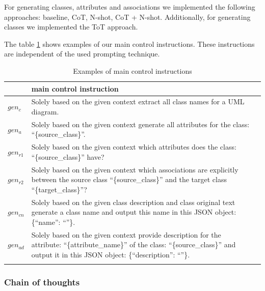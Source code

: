 For generating classes, attributes and associations we implemented the following approaches: baseline, CoT, N-shot, CoT + N-shot. Additionally, for generating classes we implemented the ToT approach.

The table \ref{tab:main-control-instructions} shows examples of our main control instructions. These instructions are independent of the used prompting technique.

\begin{table}[!h]
    \scriptsize
    \centering
    \setlength{\tabcolsep}{0.5em}
\begin{tabular}{@{}l>{\raggedright\arraybackslash}p{}>{\raggedright\arraybackslash}p{}@{}}
         & main control instruction \\
    \toprule
    \addlinespace
    
$gen_c$ & Solely based on the given context extract all class names for a UML diagram. \\
\addlinespace

$gen_a$ & Solely based on the given context generate all attributes for the class: ``\{source\_class\}''. \\
\addlinespace

$gen_{r1}$ & Solely based on the given context which attributes does the class: ``\{source\_class\}'' have? \\
\addlinespace

$gen_{r2}$ & Solely based on the given context which associations are explicitly between the source class ``\{source\_class\}'' and the target class ``\{target\_class\}''? \\
\addlinespace

$gen_{cn}$ & Solely based on the given class description and class original text generate a class name and output this name in this JSON object: \{``name'': ``''\}. \\
\addlinespace

$gen_{ad}$ & Solely based on the given context provide description for the attribute: ``\{attribute\_name\}'' of the class: ``\{source\_class\}'' and output it in this JSON object: \{``description'': ``''\}. \\
\addlinespace

	\bottomrule
	\addlinespace
	\end{tabular}
	\caption{Examples of main control instructions}
	\label{tab:main-control-instructions}
\end{table}


\subsubsection{Chain of thoughts}

